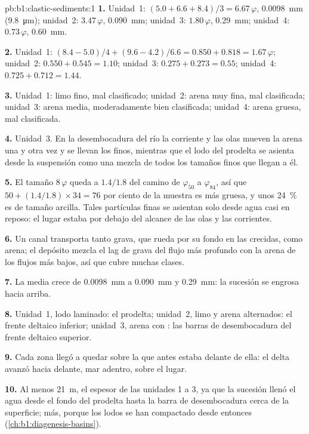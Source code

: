 \begin{solution}{pb:b1:clastic-sediments:1}
\textbf{1.} Unidad~1: $(5.0 + 6.6 + 8.4)/3 = 6.67\,\varphi$, \qty{0.0098}{mm}
(\qty{9.8}{\micro m}); unidad~2: $3.47\,\varphi$, \qty{0.090}{mm}; unidad~3:
$1.80\,\varphi$, \qty{0.29}{mm}; unidad~4: $0.73\,\varphi$, \qty{0.60}{mm}.

\textbf{2.} Unidad~1: $(8.4 - 5.0)/4 + (9.6 - 4.2)/6.6 = 0.850 + 0.818 =
1.67\,\varphi$; unidad~2: $0.550 + 0.545 = 1.10$; unidad~3: $0.275 + 0.273 = 0.55$;
unidad~4: $0.725 + 0.712 = 1.44$.

\textbf{3.} Unidad~1: limo fino, mal clasificado; unidad~2: arena muy fina, mal
clasificada; unidad~3: arena media, moderadamente bien clasificada; unidad~4: arena gruesa,
mal clasificada.

\textbf{4.} Unidad~3. En la desembocadura del río la corriente y las olas mueven la arena una y otra vez y se llevan los finos, mientras que el lodo del prodelta se asienta desde la suspensión como una mezcla de todos los tamaños finos que llegan a él.

\textbf{5.} El tamaño $8\,\varphi$ queda a $1.4/1.8$ del camino de $\varphi_{50}$ a $\varphi_{84}$, así que $50 + (1.4/1.8) \times 34 = 76$ por ciento de la
muestra es más gruesa, y unos \qty{24}{\percent} es de tamaño arcilla. Tales partículas finas se asientan solo desde agua casi en reposo: el lugar estaba por debajo del alcance de las olas
y las corrientes.

\textbf{6.} Un canal transporta tanto grava, que rueda por su fondo en las crecidas, como arena; el depósito mezcla el lag de grava del flujo más profundo con la arena de los flujos más bajos, así que cubre muchas clases.

\textbf{7.} La media crece de \qty{0.0098}{mm} a \qty{0.090}{mm} y \qty{0.29}{mm}: la sucesión se engrosa hacia arriba.

\textbf{8.} Unidad~1, lodo laminado: el prodelta; unidad~2, limo y arena alternados: el frente deltaico inferior; unidad~3, arena con : las barras de
desembocadura del frente deltaico superior.

\textbf{9.} Cada zona llegó a quedar sobre la que antes estaba delante de ella: el delta avanzó hacia delante, mar adentro, sobre el lugar.

\textbf{10.} Al menos \qty{21}{m}, el espesor de las unidades 1 a 3, ya que la sucesión llenó el agua desde el fondo del prodelta hasta la barra de desembocadura cerca de la superficie;
más, porque los lodos se han compactado desde entonces (\cref{ch:b1:diagenesis-basins}).


\end{solution}
